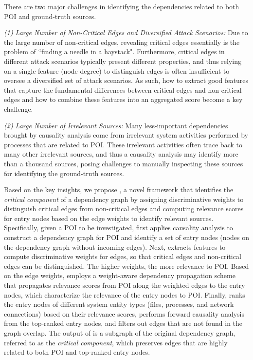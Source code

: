 There are two major challenges in identifying the dependencies related to both POI and ground-truth sources.

\emph{(1) Large Number of Non-Critical Edges and Diversified Attack Scenarios:} Due to the large number of non-critical edges, revealing critical edges essentially is the problem of ``finding a needle in a haystack". Furthermore, critical edges in different attack scenarios typically present different properties, and thus relying on a single feature (\eg node degree) to 
distinguish edges is often insufficient to oversee a diversified set of attack scenarios.
As such, how to extract good features that capture the fundamental differences between critical edges and non-critical edges and how to combine these features into an aggregated score 
become a key challenge.

\emph{(2) Large Number of Irrelevant Sources:} 
Many less-important dependencies brought by causality analysis come from irrelevant system activities performed by processes that are related to POI. 
These irrelevant activities often trace back to many other irrelevant sources, and thus a causality analysis may identify more than a thousand sources, posing challenges to manually inspecting these sources for identifying the ground-truth sources.

Based on the key insights, we propose \tool, a novel framework that identifies the \emph{critical component} of a dependency graph by assigning discriminative weights to distinguish critical edges from non-critical edges 
and computing relevance scores for entry nodes based on the edge weights to identify relevant sources. 
Specifically, given a POI to be investigated, \tool first applies causality analysis to construct a dependency graph for POI and identify a set of entry nodes (\ie nodes on the dependency graph without incoming edges).
Next, \tool extracts features to
compute discriminative weights for edges, so that critical edges and non-critical edges can be distinguished.
The higher weights, the more 
relevance to POI.
Based on the edge weights, \tool employs a weight-aware dependency propagation scheme that propagates relevance scores from POI along the weighted edges to the entry nodes, which characterize the relevance of the entry nodes to POI.
Finally, \tool ranks the entry nodes of different system entity types (\eg files, processes, and network connections) based on their relevance scores,
performs forward causality analysis from the top-ranked entry nodes,
and filters out edges that are not found in the graph overlap.
The output of \tool is a subgraph of the original dependency graph, referred to as the \emph{critical component}, which preserves edges that are highly related to both POI and top-ranked entry nodes.




